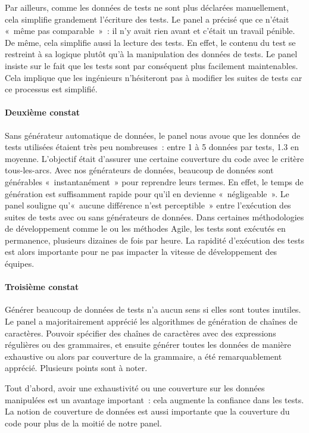 Par ailleurs, comme les données de tests ne sont plus déclarées manuellement,
cela simplifie grandement l'écriture des tests. Le panel a précisé que ce
n'était «~même pas comparable~»~: il n'y avait rien avant et c'était un travail
pénible. De même, cela simplifie aussi la lecture des tests. En effet, le
contenu du test se restreint à sa logique plutôt qu'à la manipulation des
données de tests. Le panel insiste sur le fait que les tests sont par conséquent
plus facilement maintenables. Cela implique que les ingénieurs n'hésiteront pas
à modifier les suites de tests car ce processus est simplifié.

\paragraph{Deuxième constat} Sans générateur automatique de données, le panel
nous avoue que les données de tests utilisées étaient très peu nombreuses~:
entre 1 à 5 données par tests, 1.3 en moyenne. L'objectif était d'assurer une
certaine couverture du code avec le critère tous-les-arcs. Avec nos générateurs
de données, beaucoup de données sont générables «~instantanément~» pour
reprendre leurs termes. En effet, le temps de génération est suffisamment rapide
pour qu'il en devienne «~négligeable~». Le panel souligne qu'«~aucune différence
n'est perceptible~» entre l'exécution des suites de tests avec ou sans
générateurs de données. Dans certaines méthodologies de développement comme le
 ou les méthodes Agile, les tests sont
exécutés en permanence, plusieurs dizaines de fois par heure. La rapidité
d'exécution des tests est alors importante pour ne pas impacter la vitesse de
développement des équipes.

\paragraph{Troisième constat} Générer beaucoup de données de tests n'a aucun
sens si elles sont toutes inutiles. Le panel a majoritairement apprécié les
algorithmes de génération de chaînes de caractères. Pouvoir spécifier des
chaînes de caractères avec des expressions régulières ou des grammaires, et
ensuite générer toutes les données de manière exhaustive ou alors par couverture
de la grammaire, a été remarquablement apprécié. Plusieurs points sont à noter.

Tout d'abord, avoir une exhaustivité ou une couverture sur les données
manipulées est un avantage important~: cela augmente la confiance dans les
tests. La notion de couverture de données est aussi importante que la couverture
du code pour plus de la moitié de notre panel.

